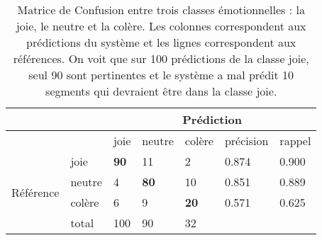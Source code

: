 \begin{table}[h]
  \centering
\begin{tabular}{|l|l|l|l|l||l|l|}
\hline
       &              &\multicolumn{5}{|c|}{Prédiction} \\ \hline
       &             & joie        & neutre      & colère      &précision &rappel\\ \hline
\multirow{4}{*}{Référence} &joie   & \textbf{90} & 11          & 2           &0.874     &0.900\\ \hline
                     & neutre & 4           & \textbf{80} & 10          &0.851     &0.889\\ \hline
                     & colère & 6           & 9           & \textbf{20} &0.571     &0.625\\ \hline \hline
                     & total  & 100         & 90          & 32           & & \\ \hline
\end{tabular}
\caption{Matrice de Confusion entre trois classes émotionnelles : la joie, le neutre et la colère. Les colonnes correspondent aux prédictions du système et les lignes correspondent aux références. On voit que sur 100 prédictions de la classe joie, seul 90 sont pertinentes et le système a mal prédit 10 segments qui devraient être dans la classe joie.}
\label{tab:matriceConf}
\end{table}
